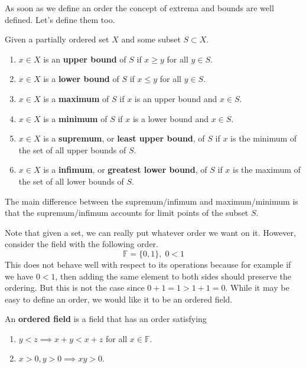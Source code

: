 \documentclass{article}
\begin{document}
      As soon as we define an order the concept of extrema and bounds are well defined. Let's define them too. 

      \begin{definition}
        Given a partially ordered set $X$ and some subset $S \subset X$. 
        \begin{enumerate}
          \item $x \in X$ is an \textbf{upper bound} of $S$ if $x \geq y$ for all $y \in S$. 
          \item $x \in X$ is a \textbf{lower bound} of $S$ if $x \leq y$ for all $y \in S$. 
          \item $x \in X$ is a \textbf{maximum} of $S$ if $x$ is an upper bound and $x \in S$. 
          \item $x \in X$ is a \textbf{minimum} of $S$ if $x$ is a lower bound and $x \in S$. 
          \item $x \in X$ is a \textbf{supremum}, or \textbf{least upper bound}, of $S$ if $x$ is the minimum of the set of all upper bounds of $S$. 
          \item $x \in X$ is a \textbf{infimum}, or \textbf{greatest lower bound}, of $S$ if $x$ is the maximum of the set of all lower bounds of $S$. 
        \end{enumerate}
        The main difference between the supremum/infimum and maximum/minimum is that the supremum/infimum accounts for limit points of the subset $S$. 
      \end{definition}

      Note that given a set, we can really put whatever order we want on it. However, consider the field with the following order. 
      \begin{equation}
        \mathbb{F} = \{0, 1\}, \; 0 < 1
      \end{equation} 
      This does not behave well with respect to its operations because for example if we have $0 < 1$, then adding the same element to both sides should preserve the ordering. But this is not the case since $0 + 1 = 1 > 1 + 1 = 0$. While it may be easy to define an order, we would like it to be an ordered field. 

      \begin{definition}
        An \textbf{ordered field} is a field that has an order satisfying 
        \begin{enumerate}
          \item $y < z \implies x + y < x + z$ for all $x \in \mathbb{F}$. 
          \item $x > 0, y > 0 \implies xy > 0$. 
        \end{enumerate}
      \end{definition}
\end{document}
